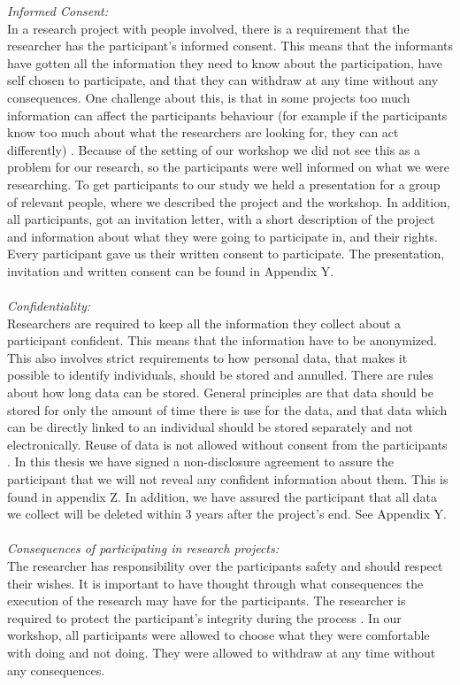 \emph{Informed Consent:} \\
In a research project with people involved, there is a requirement that the researcher has the participant's informed consent. This means that the informants have gotten all the information they need to know about the participation, have self chosen to participate, and that they can withdraw at any time without any consequences. One challenge about this, is that in some projects too much information can affect the participants behaviour (for example if the participants know too much about what the researchers are looking for, they can act differently) \cite{qualitative}. Because of the setting of our workshop we did not see this as a problem for our research, so the participants were well informed on what we were researching. To get participants to our study we held a presentation for a group of relevant people, where we described the project and the workshop. In addition, all participants, got an invitation letter, with a short description of the project and information about what they were going to participate in, and their rights. Every participant gave us their written consent to participate. The presentation, invitation and written consent can be found in Appendix Y.   \\ \\
\emph{Confidentiality:}\\
Researchers are required to keep all the information they collect about a participant confident. This means that the information have to be anonymized. This also involves strict requirements to how personal data, that makes it possible to identify individuals, should be stored and annulled. There are rules about how long data can be stored. General principles are that data should be stored for only the amount of time there is use for the data, and that data which can be directly linked to an individual should be stored separately and not electronically.  Reuse of data is not allowed without consent from the participants \cite{qualitative}. In this thesis we have signed a non-disclosure agreement to assure the participant that we will not reveal any confident information about them. This is found in appendix Z. In addition, we have assured the participant that all data we collect will be deleted within 3 years after the project's end. See Appendix Y. \\ \\
\emph{Consequences of participating in research projects:}\\
The researcher has responsibility over the participants safety and should respect their wishes. It is important to have thought through what consequences the execution of the research may have for the participants. The researcher is required to protect the participant's integrity during the process \cite{qualitative}. In our workshop, all participants were allowed to choose what they were comfortable with doing and not doing. They were allowed to withdraw at any time without any consequences.  \\ \\


